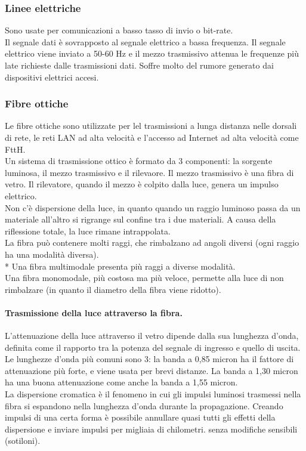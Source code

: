 \documentclass{article}
\begin{document}
		\subsubsection{Linee elettriche}
		Sono usate per comunicazioni a basso tasso di invio o bit-rate.\\
		Il segnale dati è sovrapposto al segnale elettrico a bassa frequenza. Il segnale elettrico viene inviato a 50-60 Hz e il mezzo trasmissivo attenua le frequenze più late richieste dalle trasmissioni dati. Soffre molto del rumore generato dai dispositivi elettrici accesi.
		\subsubsection{Fibre ottiche}
		Le fibre ottiche sono utilizzate per lel trasmissioni a lunga distanza nelle dorsali di rete, le reti LAN ad alta velocità e l'accesso ad Internet ad alta velocità come FttH. \\
		Un sistema di trasmissione ottico è formato da 3 componenti: la sorgente luminosa, il mezzo trasmissivo e il rilevaore. 
		Il mezzo trasmissivo è una fibra di vetro. Il rilevatore, quando il mezzo è colpito dalla luce, genera un impulso elettrico.\\
		Non c'è dispersione della luce, in quanto quando un raggio luminoso passa da un materiale all'altro si rigrange sul confine tra i due materiali. A causa della riflessione totale, la luce rimane intrappolata. \\
		La fibra può contenere molti raggi, che rimbalzano ad angoli diversi (ogni raggio ha una modalità diversa). \\*
		Una fibra multimodale presenta più raggi a diverse modalità.\\
		Una fibra monomodale, più costosa ma più veloce, permette alla luce di non rimbalzare (in quanto il diametro della fibra viene ridotto).
		\paragraph{Trasmissione della luce attraverso la fibra.}
		L'attenuazione della luce attraverso il vetro dipende dalla sua lunghezza d'onda, definita come il rapporto tra la potenza del segnale di ingresso e quello di uscita.\\
		Le lunghezze d'onda più comuni sono 3: la banda a 0,85 micron ha il fattore di attenuazione più forte, e viene usata per brevi distanze. La banda a 1,30 micron ha una buona attenuazione come anche la banda a 1,55 micron.\\
		La dispersione cromatica è il fenomeno in cui gli impulsi luminosi trasmessi nella fibra si espandono nella lunghezza d'onda durante la propagazione. Creando impulsi di una certa forma è possibile annullare quasi tutti gli effetti della dispersione e inviare impulsi per migliaia di chilometri. senza modifiche sensibili (sotiloni).
\end{document}
